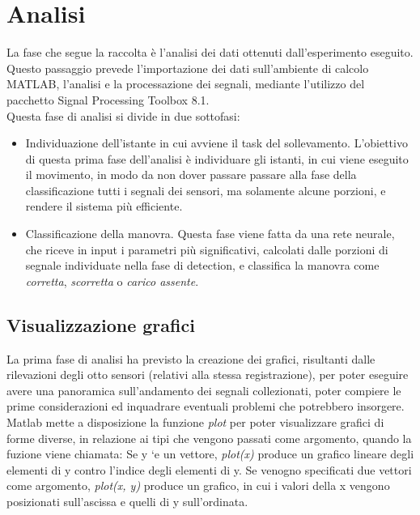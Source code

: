 \documentclass[a4paper]{article}
\begin{document}
\section{Analisi}
La fase che segue la raccolta è l'analisi dei dati ottenuti dall'esperimento eseguito. Questo passaggio prevede l'importazione dei dati sull'ambiente di calcolo MATLAB, l'analisi e la processazione dei segnali, mediante l'utilizzo  del pacchetto Signal Processing Toolbox 8.1. \\
Questa fase di analisi si divide in due sottofasi:
\begin {itemize}
\item Individuazione dell'istante in cui avviene il task del sollevamento. L'obiettivo di questa prima fase dell'analisi è individuare gli istanti, in cui viene eseguito il movimento, in modo da non dover passare  passare alla fase della classificazione tutti i segnali dei sensori, ma solamente alcune porzioni, e rendere il sistema più efficiente.
\item Classificazione della manovra. Questa fase viene fatta da una rete neurale, che riceve in input i parametri più significativi, calcolati dalle porzioni di segnale individuate nella fase di detection, e classifica la manovra come \textit{corretta}, \textit{scorretta} o \textit{carico assente}.
\end{itemize}

\subsection{Visualizzazione grafici}
La prima fase di analisi ha previsto la creazione dei grafici, risultanti dalle rilevazioni degli otto sensori (relativi alla stessa registrazione), per poter eseguire avere una panoramica sull'andamento dei segnali collezionati, poter compiere le prime considerazioni ed inquadrare eventuali problemi che potrebbero insorgere.\\
Matlab mette a disposizione la funzione \textit{plot} per poter visualizzare grafici di forme diverse, in relazione ai tipi che vengono passati come argomento, quando la fuzione viene chiamata:  Se y `e un vettore, \textit{plot(x)} produce un grafico lineare degli elementi di y contro l’indice degli elementi di y.  Se venogno specificati due vettori come argomento,\textit{ plot(x, y) } produce un grafico, in cui i valori della x vengono posizionati sull'ascissa e quelli di y sull'ordinata. \\
\clearpage
\end{document}
